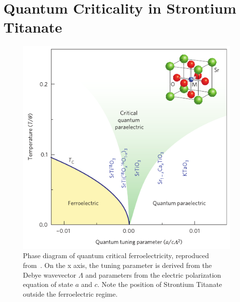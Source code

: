 \documentclass{thesis-umich}
\begin{document}
\section{Quantum Criticality in Strontium Titanate}

\begin{figure}
	\centering
	\caption[Quantum Critical Ferroelectric Phase Diagram]{Phase diagram of quantum critical ferroelectricity, reproduced from~\cite{Rowley2014}. On the x axis, the tuning parameter is derived from the Debye wavevector $\Lambda$ and parameters from the electric polarization equation of state $a$ and $c$. Note the position of Strontium Titanate outside the ferroelectric regime.}
	\includegraphics[width=0.6\columnwidth]{figures/sto_phasedia_rowley.pdf}
\end{figure}
\end{document}
